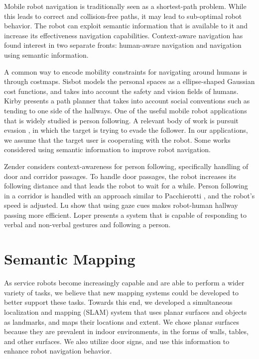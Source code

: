 \documentclass{tADR2e}
\begin{document}
Mobile robot navigation is traditionally seen as a shortest-path problem. 
While this leads to correct and collision-free paths, it may lead to sub-optimal robot behavior.
The robot can exploit semantic information that is available to it and increase its effectiveness
navigation capabilities. Context-aware navigation has found interest in two separate fronts: 
human-aware navigation and navigation using semantic information.

A common way to encode mobility constraints for navigating around humans is through costmaps. Sisbot \cite{sisbot2007human} models the
personal spaces as a ellipse-shaped Gaussian cost functions, and takes into account
the safety and vision fields of humans. Kirby \cite{kirby2009companion} presents a path planner that takes
into account social conventions such as tending to one side of the hallways. One of the useful mobile robot applications that is widely studied is person following.
A relevant body of work is pursuit evasion \cite{chung2011search}, in which the target is trying to evade the follower. In
our applications, we assume that the target user is cooperating with the robot. 
Some works considered using semantic information to improve robot navigation. 


Zender \cite{zender2007human} considers context-awareness for person following, specifically handling of door and corridor passages. To
handle door passages, the robot increases its following distance and that leads the robot
to wait for a while. Person following in a corridor is handled with an approach similar to
Pacchierotti \cite{pacchierotti2005human}, and the robot’s speed is adjusted. Lu \cite{lu2013towards} show that using gaze cues makes 
robot-human hallway passing more efficient. Loper \cite{loper2009mobile} presents a system that
is capable of responding to verbal and non-verbal gestures and following a person.

\section{Semantic Mapping}
\label{sec:slam_and_semantic_mapping}

As service robots become increasingly capable and are able to perform a wider
variety of tasks, we believe that new mapping systems could be developed to better
support these tasks. Towards this end, we developed a simultaneous localization
and mapping (SLAM) system that uses planar surfaces and objects as landmarks, and maps their locations and extent. We chose planar surfaces because they are prevalent in indoor environments, in the forms of walls, tables, and other surfaces.   We also utilize door signs, and use this information to enhance robot navigation behavior.
\end{document}
